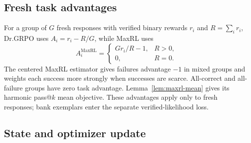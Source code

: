 \documentclass{article}
\newcommand{\1}{\mathbf 1}
\theoremstyle{remark}
\theoremstyle{definition}
\theoremstyle{plain}
\begin{document}
\subsection{Fresh task advantages}
\label{app:binary-maxrl}

For a group of $G$ fresh responses with verified binary rewards $r_i$ and
$R=\sum_i r_i$, Dr.GRPO uses $A_i=r_i-R/G$, while MaxRL uses
\[
 A_i^{\mathrm{MaxRL}}=
 \begin{cases}
 G r_i/R-1, & R>0,\\
 0, & R=0.
 \end{cases}
\]
The centered MaxRL estimator \citep{tajwar2026maxrl} gives failures advantage
$-1$ in mixed groups and weights each success more strongly when successes
are scarce. All-correct and all-failure groups have zero task advantage.
Lemma~\ref{lem:maxrl-mean} gives its harmonic pass@\(k\) mean objective.
These advantages apply only to fresh responses; bank exemplars enter the
separate verified-likelihood loss.

\subsection{State and optimizer update}
\label{app:algorithm-update}
\end{document}
